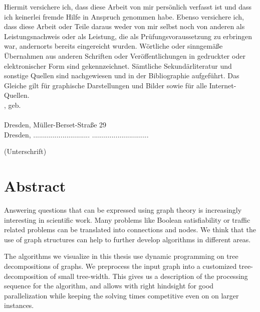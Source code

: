 \documentclass[a4paper, 12pt, bibliography=totoc]{scrartcl}
\begin{document}
\noindent
Hiermit versichere ich, dass diese Arbeit von mir persönlich verfasst ist und dass ich
keinerlei fremde Hilfe in Anspruch genommen habe. Ebenso versichere ich, dass diese Arbeit
oder Teile daraus weder von mir selbst noch von anderen als Leistungsnachweis oder als Leistung, die als Prüfungsvoraussetzung
zu erbringen war, andernorts bereits eingereicht wurden. Wörtliche oder sinngemäße Übernahmen aus anderen Schriften
oder Veröffentlichungen in gedruckter oder elektronischer Form sind gekennzeichnet.
Sämtliche Sekundärliteratur und sonstige Quellen sind nachgewiesen und in der Bibliographie aufgeführt.
Das Gleiche gilt für graphische Darstellungen und Bilder sowie für alle Internet-Quellen. \\[20pt]

\noindent
\myauthor, geb. \mybirthday \\\\
 Dresden, Müller-Berset-Straße 29\\[80pt]


Dresden,  ............................. \hfill .............................
\begin{flushright}
	(Unterschrift)\hspace{1em}
\end{flushright}


\newpage

\section*{Abstract}
\vspace{4ex}

Answering questions that can be expressed using graph theory is increasingly interesting in scientific work.
Many problems like Boolean satisfiability or traffic related problems can be translated into connections and nodes.
We think that the use of graph structures can help to further develop algorithms in different areas.

The algorithms we visualize in this thesis use dynamic programming on tree decompositions of graphs.
We preprocess the input graph into a customized tree-decomposition of small tree-width.
This gives us a description of the processing sequence for the algorithm, and allows 
with right hindsight for good parallelization while keeping the solving times competitive even on on larger instances.
\end{document}
